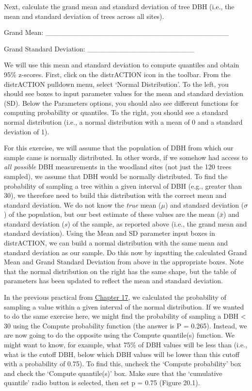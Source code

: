 \documentclass[
  openany]{scrbook}
\begin{document}
Next, calculate the grand mean and standard deviation of tree DBH (i.e., the mean and standard deviation of trees across all sites).

Grand Mean: \_\_\_\_\_\_\_\_\_\_\_\_\_\_\_\_\_\_\_\_\_\_\_\_\_\_\_\_\_\_\_\_\_\_\_\_

Grand Standard Deviation: \_\_\_\_\_\_\_\_\_\_\_\_\_\_\_\_\_\_\_\_\_

We will use this mean and standard deviation to compute quantiles and obtain 95\% z-scores.
First, click on the distrACTION icon in the toolbar.
From the distrACTION pulldown menu, select `Normal Distribution'.
To the left, you should see boxes to input parameter values for the mean and standard deviation (SD).
Below the Parameters options, you should also see different functions for computing probability or quantiles.
To the right, you should see a standard normal distribution (i.e., a normal distribution with a mean of 0 and a standard deviation of 1).

For this exercise, we will assume that the population of DBH from which our sample came is normally distributed.
In other words, if we somehow had access to \emph{all possible} DBH measurements in the woodland sites (not just the 120 trees sampled), we assume that DBH would be normally distributed.
To find the probability of sampling a tree within a given interval of DBH (e.g., greater than 30), we therefore need to build this distribution with the correct mean and standard deviation.
We do not know the \emph{true} mean (\(\mu\)) and standard deviation (\(\sigma\)) of the population, but our best estimate of these values are the mean (\(\bar{x}\)) and standard deviation (\(s\)) of the sample, as reported above (i.e., the grand mean and standard deviation).
Using the Mean and SD parameter input boxes in distrACTION, we can build a normal distribution with the same mean and standard deviation as our sample.
Do this now by inputting the calculated Grand Mean and Grand Standard Deviation from above in the appropriate boxes.
Note that the normal distribution on the right has the same shape, but the table of parameters has been updated to reflect the mean and standard deviation.

In the previous practical from \protect\hyperlink{Chapter_17}{Chapter 17}, we calculated the probability of sampling a value within a given interval of the normal distribution.
If we wanted to do the same exercise here, we might find the probability of sampling a DBH \textless{} 30 using the Compute probability function (the answer is P = 0.265).
Instead, we are now going to do the opposite using the Compute quantile(s) function.
We might want to know, for example, what 75\% of DBH values will be less than (i.e., what is the cutoff DBH, below which DBH values will be lower than this cutoff with a probability of 0.75).
To find this, uncheck the `Compute probability' box and check the `Compute quantile(s)' box.
Make sure that the `cumulative quantile' radio button is selected, then set p = 0.75 (Figure 20.1).
\end{document}
